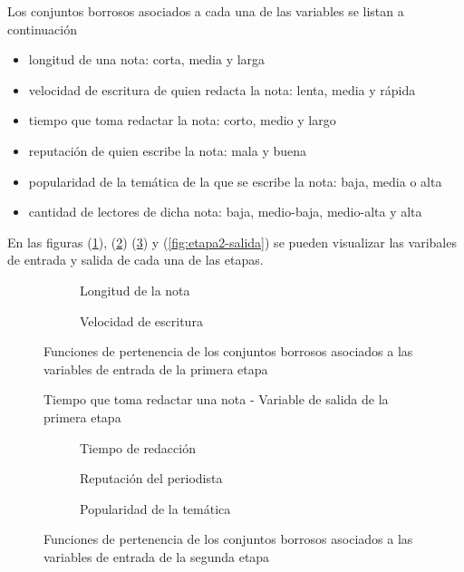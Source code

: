 \documentclass{article}
\begin{document}
\begin{itemize}
\vspace{3mm}
Los conjuntos borrosos asociados a cada una de las variables se listan a continuación

\begin{itemize}
	\setlength\itemsep{0.001em} %
	\item longitud de una nota: corta, media y larga
	\item velocidad de escritura de quien redacta la nota: lenta, media y rápida
	\item tiempo que toma redactar la nota: corto, medio y largo
	\item reputación de quien escribe la nota: mala y buena
	\item popularidad de la temática de la que se escribe la nota: baja, media o alta
	\item cantidad de lectores de dicha nota: baja, medio-baja, medio-alta y alta
\end{itemize}

En las figuras (\ref{fig:etapa1-entrada}), (\ref{fig:etapa1-salida}) (\ref{fig:etapa2-entrada}) y (\ref{fig:etapa2-salida}) se pueden visualizar las varibales de entrada y salida de cada una de las etapas.

\begin{figure}[H]
	\centering
	\begin{subfigure}[b]{0.4\textwidth}
		\centering
		\caption{Longitud de la nota}
	\end{subfigure}
	\qquad
	\begin{subfigure}[b]{0.4\textwidth}
		\centering
		\caption{Velocidad de escritura}
	\end{subfigure}
	\caption{Funciones de pertenencia de los conjuntos borrosos asociados a las variables de entrada de la primera etapa}
	\label{fig:etapa1-entrada}
\end{figure}

\begin{figure}[H]
	\centering
	\caption{Tiempo que toma redactar una nota - Variable de salida de la primera etapa}
	\label{fig:etapa1-salida}
\end{figure}

\begin{figure}[H]
	\centering
	\begin{subfigure}[b]{0.3\textwidth}
		\centering
		\caption{Tiempo de redacción}
	\end{subfigure}
	\hfill
	\begin{subfigure}[b]{0.3\textwidth}
		\centering
		\caption{Reputación del periodista}
	\end{subfigure}
	\hfill
	\begin{subfigure}[b]{0.3\textwidth}
		\centering
		\caption{Popularidad de la temática}
	\end{subfigure}
	\caption{Funciones de pertenencia de los conjuntos borrosos asociados a las variables de entrada de la segunda etapa}
	\label{fig:etapa2-entrada}
\end{figure}


\end{itemize}
\end{document}
